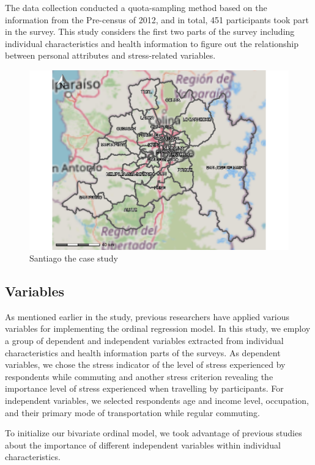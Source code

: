 \documentclass[
11pt, %
oneside, %
english, %
singlespacing, %
]{macthesis} %
\begin{document}
The data collection conducted a quota-sampling method based on the information from the Pre-census of 2012, and in total, 451 participants took part in the survey. This study considers the first two parts of the survey including individual characteristics and health information to figure out the relationship between personal attributes and stress-related variables.
\begin{figure}

{\centering \includegraphics[width=0.85\linewidth]{thesis_files/figure-latex/unnamed-chunk-19-1} 

}

\caption{\label{fig:study boundaries}Santiago the case study}\label{fig:unnamed-chunk-19}
\end{figure}
\hypertarget{variables}{%
\subsection{Variables}\label{variables}}

As mentioned earlier in the study, previous researchers have applied various variables for implementing the ordinal regression model. In this study, we employ a group of dependent and independent variables extracted from individual characteristics and health information parts of the surveys. As dependent variables, we chose the stress indicator of the level of stress experienced by respondents while commuting and another stress criterion revealing the importance level of stress experienced when travelling by participants. For independent variables, we selected respondents age and income level, occupation, and their primary mode of transportation while regular commuting.

To initialize our bivariate ordinal model, we took advantage of previous studies about the importance of different independent variables within individual characteristics.
\end{document}
